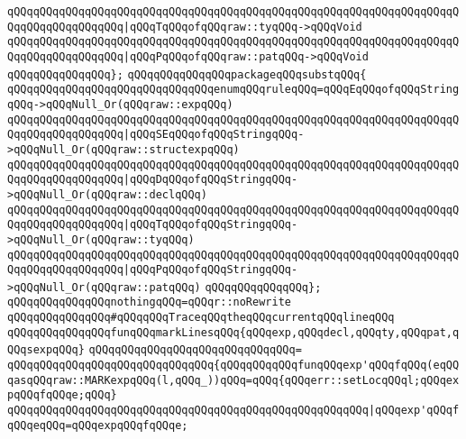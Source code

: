 \verb|qQQqqQQqqQQqqQQqqQQqqQQqqQQqqQQqqQQqqQQqqQQqqQQqqQQqqQQqqQQqqQQqqQQqqQQqqQQqqQQqqQQqqQQq|\verb#|qQQqTqQQqofqQQqraw::tyqQQq->qQQqVoid#\newline
\verb|qQQqqQQqqQQqqQQqqQQqqQQqqQQqqQQqqQQqqQQqqQQqqQQqqQQqqQQqqQQqqQQqqQQqqQQqqQQqqQQqqQQqqQQq|\verb#|qQQqPqQQqofqQQqraw::patqQQq->qQQqVoid#\newline
\verb|qQQqqQQqqQQqqQQq};|\newline
\newline
\verb|qQQqqQQqqQQqqQQqpackageqQQqsubstqQQq{|\newline
\newline
\verb|qQQqqQQqqQQqqQQqqQQqqQQqqQQqqQQqenumqQQqruleqQQq=qQQqEqQQqofqQQqStringqQQq->qQQqNull_Or(qQQqraw::expqQQq)|\newline
\verb|qQQqqQQqqQQqqQQqqQQqqQQqqQQqqQQqqQQqqQQqqQQqqQQqqQQqqQQqqQQqqQQqqQQqqQQqqQQqqQQqqQQqqQQq|\verb#|qQQqSEqQQqofqQQqStringqQQq->qQQqNull_Or(qQQqraw::structexpqQQq)#\newline
\verb|qQQqqQQqqQQqqQQqqQQqqQQqqQQqqQQqqQQqqQQqqQQqqQQqqQQqqQQqqQQqqQQqqQQqqQQqqQQqqQQqqQQqqQQq|\verb#|qQQqDqQQqofqQQqStringqQQq->qQQqNull_Or(qQQqraw::declqQQq)#\newline
\verb|qQQqqQQqqQQqqQQqqQQqqQQqqQQqqQQqqQQqqQQqqQQqqQQqqQQqqQQqqQQqqQQqqQQqqQQqqQQqqQQqqQQqqQQq|\verb#|qQQqTqQQqofqQQqStringqQQq->qQQqNull_Or(qQQqraw::tyqQQq)#\newline
\verb|qQQqqQQqqQQqqQQqqQQqqQQqqQQqqQQqqQQqqQQqqQQqqQQqqQQqqQQqqQQqqQQqqQQqqQQqqQQqqQQqqQQqqQQq|\verb#|qQQqPqQQqofqQQqStringqQQq->qQQqNull_Or(qQQqraw::patqQQq)#\newline
\verb|qQQqqQQqqQQqqQQq};|\newline
\newline
\verb|qQQqqQQqqQQqqQQqnothingqQQq=qQQqr::noRewrite|\newline
\newline
\verb|qQQqqQQqqQQqqQQq#qQQqqQQqTraceqQQqtheqQQqcurrentqQQqlineqQQq|\newline
\verb|qQQqqQQqqQQqqQQqfunqQQqmarkLinesqQQq{qQQqexp,qQQqdecl,qQQqty,qQQqpat,qQQqsexpqQQq}|\newline
\verb|qQQqqQQqqQQqqQQqqQQqqQQqqQQqqQQq=|\newline
\verb|qQQqqQQqqQQqqQQqqQQqqQQqqQQqqQQq{qQQqqQQqqQQqfunqQQqexp'qQQqfqQQq(eqQQqasqQQqraw::MARKexpqQQq(l,qQQq_))qQQq=qQQq{qQQqerr::setLocqQQql;qQQqexpqQQqfqQQqe;qQQq}|\newline
\verb|qQQqqQQqqQQqqQQqqQQqqQQqqQQqqQQqqQQqqQQqqQQqqQQqqQQqqQQq|\verb#|qQQqexp'qQQqfqQQqeqQQq=qQQqexpqQQqfqQQqe;#\newline
